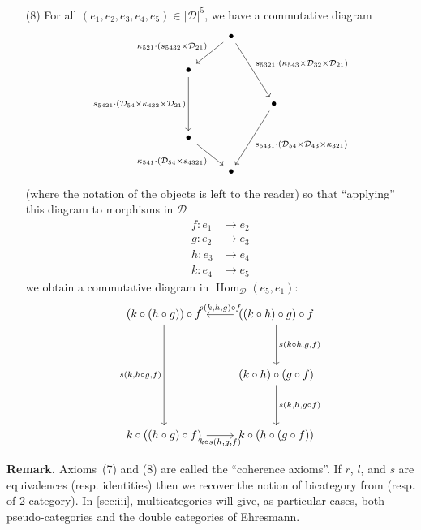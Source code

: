 \documentclass{article}
\newenvironment{rmenv}[1]
  {\phantomsection\par\medskip\noindent\textbf{#1.}\rmfamily}
  {\par\medskip}
\newcommand{\oldpage}[1]{\marginpar{\footnotesize$\Big\vert$ \textit{p.~#1}}}
\newcommand{\cat}[1]{\mathcal{#1}}
\newcommand{\set}[1]{|#1|}
\DeclareMathOperator{\Hom}{Hom}
\begin{document}
\begin{enumerate}
  \item[(8)]
    For all $(e_1,e_2,e_3,e_4,e_5)\in\set{\cat{D}}^5$, we have a commutative diagram
    \[
      \begin{tikzcd}
      & \bullet
          \ar[dl,swap,"\kappa_{521}\cdot(s_{5432}\times\cat{D}_{21})"]
          \ar[ddr,"s_{5321}\cdot(\kappa_{543}\times\cat{D}_{32}\times\cat{D}_{21})"]
      \\\bullet
          \ar[dd,swap,"s_{5421}\cdot(\cat{D}_{54}\times\kappa_{432}\times\cat{D}_{21})"]
      \\
      &&\bullet
          \ar[ddl,"s_{5431}\cdot(\cat{D}_{54}\times\cat{D}_{43}\times\kappa_{321})"]
      \\\bullet
          \ar[dr,swap,"\kappa_{541}\cdot(\cat{D}_{54}\times s_{4321})"]
      \\
      & \bullet
      \end{tikzcd}
    \]
    (where the notation of the objects is left to the reader) so that ``applying'' this diagram to morphisms in $\cat{D}$
    \[
      \begin{aligned}
        f\colon e_1
      & \to e_2
      \\g\colon e_2
      & \to e_3
      \\h\colon e_3
      & \to e_4
      \\k\colon e_4
      & \to e_5
      \end{aligned}
    \]
     we obtain a commutative diagram in $\Hom_\cat{D}(e_5,e_1)$:
     \[
       \begin{tikzcd}[row sep=huge]
          (k\circ(h\circ g))\circ f
            \ar[dd,swap,"{s(k,h\circ g,f)}"]
        & ((k\circ h)\circ g)\circ f
            \ar[l,swap,"{s(k,h,g)\circ f}"]
            \ar[d,"{s(k\circ h,g,f)}"]
        \\
        & (k\circ h)\circ(g\circ f)
            \ar[d,"{s(k,h,g\circ f)}"]
        \\k\circ((h\circ g)\circ f)
            \ar[r,swap,"{k\circ s(h,g,f)}"]
        & k\circ(h\circ(g\circ f))
       \end{tikzcd}
     \]
\end{enumerate}

\begin{rmenv}{Remark}
  \oldpage{246}
  Axioms~(7) and (8) are called the ``coherence axioms''.
  If $r$, $l$, and $s$ are equivalences (resp. identities) then we recover the notion of bicategory from \cite{Be} (resp. of 2-category).
  In \cref{sec:iii}, multicategories will give, as particular cases, both pseudo-categories and the double categories of Ehresmann.
\end{rmenv}
\end{document}

